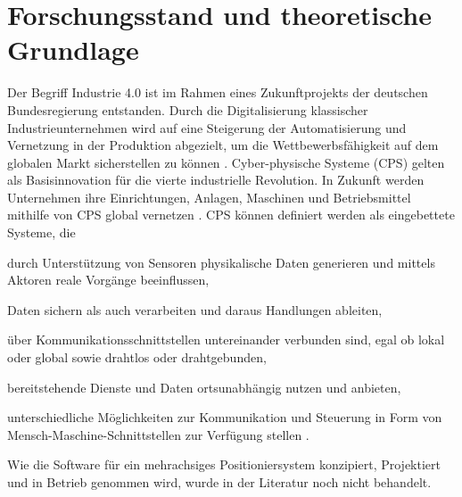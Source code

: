 \documentclass[12pt, a4paper, twoside]{article} %
\begin{document}
\section{Forschungsstand und theoretische Grundlage}
Der Begriff Industrie 4.0 ist im Rahmen eines Zukunftprojekts der deutschen Bundesregierung entstanden. Durch die Digitalisierung klassischer Industrieunternehmen wird auf eine Steigerung der Automatisierung und Vernetzung in der Produktion abgezielt, um die Wettbewerbsfähigkeit auf dem globalen Markt sicherstellen zu können \cite[S. 63]{Winkelhake2021}. Cyber-physische Systeme (CPS) gelten als Basisinnovation für die vierte industrielle Revolution. In Zukunft werden Unternehmen ihre Einrichtungen, Anlagen, Maschinen und Betriebsmittel mithilfe von CPS global vernetzen \cite[S. 5]{Wissenschaft2013}. CPS können definiert werden als eingebettete Systeme, die
\begin{compactitem}
	\item durch Unterstützung von Sensoren physikalische Daten generieren und mittels Aktoren reale Vorgänge beeinflussen,
	\item Daten sichern als auch verarbeiten und daraus Handlungen ableiten,
	\item über Kommunikationsschnittstellen untereinander verbunden sind, egal ob lokal oder global sowie drahtlos oder drahtgebunden,
	\item bereitstehende Dienste und Daten ortsunabhängig nutzen und anbieten,
	\item unterschiedliche Möglichkeiten zur Kommunikation und Steuerung in Form von
Mensch-Maschine-Schnittstellen zur Verfügung stellen \cite[S. 22]{Geisberger2012}.
\end{compactitem}
Wie die Software für ein mehrachsiges Positioniersystem konzipiert, Projektiert und in Betrieb genommen wird, wurde in der Literatur noch nicht behandelt.
\end{document}
